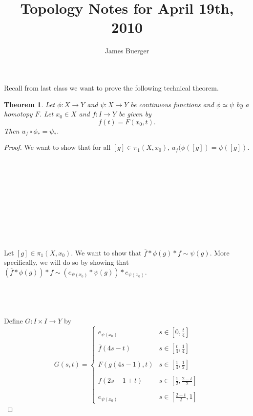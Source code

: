 \documentclass[11pt,reqno]{article}
\newtheorem{Theorem}{Theorem}
\theoremstyle{definition}
\begin{document}
\author{James Buerger}
\date{}

\title{Topology Notes for  April 19th, 2010}
\maketitle

Recall from last class we want to prove the following technical theorem.

\begin{Theorem}
Let $\phi:X\rightarrow Y$ and $\psi:X\rightarrow Y$ be continuous functions and $\phi\simeq \psi$ by a homotopy $F$. Let $x_0\in X$ and $f:I\rightarrow Y$ be given by 
$$
f(t)=F(x_0,t).
$$
Then $u_f\circ\phi_*=\psi_*$.
\end{Theorem}
\begin{proof}
We want to show that for all $[g]\in\pi_1(X,x_0)$, $u_f(\phi([g])=\psi([g])$.
\\
\\
\\
\\
\\
\\
\\
\\
\\
\\
\\
Let $[g]\in\pi_1(X,x_0)$. We want to show that $\overline{f}*\phi(g)*f\sim \psi(g)$. More specifically, we will do so by showing that $\left(\overline{f}*\phi(g)\right)*f\sim \left( e_{\psi(x_0)}*\psi(g)\right)*e_{\psi(x_0)}$.
\\
\\
\\
\\
\\
Define $G:I\times I\rightarrow Y$ by 
$$
G(s,t)=
\left\{
\begin{array}{ll}
e_{\psi(x_0)} &s\in\left[0,\frac{t}{4}\right]\\ \\
\overline{f}(4s-t) &s\in\left[\frac{t}{4},\frac{1}{4}\right]\\ \\
F(g(4s-1),t) &s\in\left[\frac{1}{4},\frac{1}{2}\right]\\ \\
f(2s-1+t) &s\in\left[\frac{1}{2},\frac{2-t}{2}\right]\\ \\
e_{\psi(x_0)} &s\in\left[\frac{2-t}{2},1\right]
\end{array}
\right.
$$

\end{proof}
\end{document}
